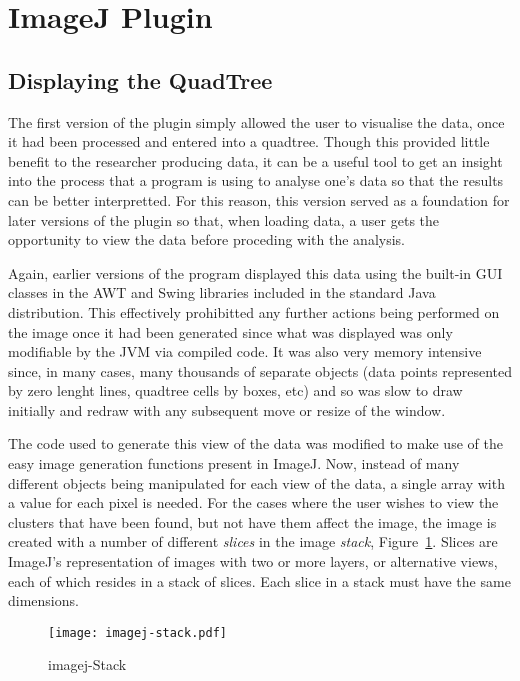 
\section{ImageJ Plugin}
\label{sec:imagej_plugin}

\cite{imagejapi}

\subsection{Displaying the QuadTree}
\label{sub:displaying_the_quadtree}

The first version of the plugin simply allowed the user to visualise the data,
once it had been processed and entered into a quadtree. Though this provided
little benefit to the researcher producing data, it can be a useful tool to get
an insight into the process that a program is using to analyse one's data so
that the results can be better interpretted. For this reason, this version
served as a foundation for later versions of the plugin so that, when loading
data, a user gets the opportunity to view the data before proceding with the
analysis.

Again, earlier versions of the program displayed this data using the built-in
GUI classes in the AWT and Swing libraries included in the standard Java
distribution. This effectively prohibitted any further actions being performed
on the image once it had been generated since what was displayed was only
modifiable by the JVM via compiled code. It was also very memory intensive
since, in many cases, many thousands of separate objects (data points
represented by zero lenght lines, quadtree cells by boxes, etc) and so was slow
to draw initially and redraw with any subsequent move or resize of the window.

The code used to generate this view of the data was modified to make use of the
easy image generation functions present in ImageJ. Now, instead of many
different objects being manipulated for each view of the data, a single array
with a value for each pixel is needed. For the cases where the user wishes to
view the clusters that have been found, but not have them affect the image, the
image is created with a number of different \emph{slices} in the image
\emph{stack}, Figure~\ref{fig:imagej-stack}. Slices are ImageJ's representation
of images with two or more layers, or alternative views, each of which resides
in a stack of slices. Each slice in a stack must have the same dimensions.

\begin{figure}[tbhp]
	\centering
	\texttt{[image: imagej-stack.pdf]}
	\caption{imagej-Stack}
	\label{fig:imagej-stack}
\end{figure}

